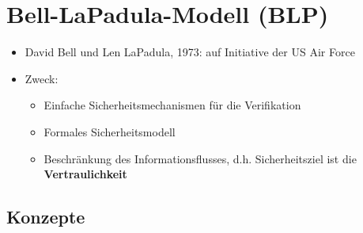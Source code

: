 \documentclass[openany]{book}
\begin{document}
\section{Bell-LaPadula-Modell (BLP)}

\begin{itemize}
\item David Bell und Len LaPadula, 1973: auf Initiative der US Air Force \\
\item Zweck:
\begin{itemize}
\item Einfache Sicherheitsmechanismen für die Verifikation
\item Formales Sicherheitsmodell
\item Beschränkung des Informationsflusses, d.h. Sicherheitsziel ist die \textbf{Vertraulichkeit}
\end{itemize}
\end{itemize}

\subsection{Konzepte}
\end{document}
